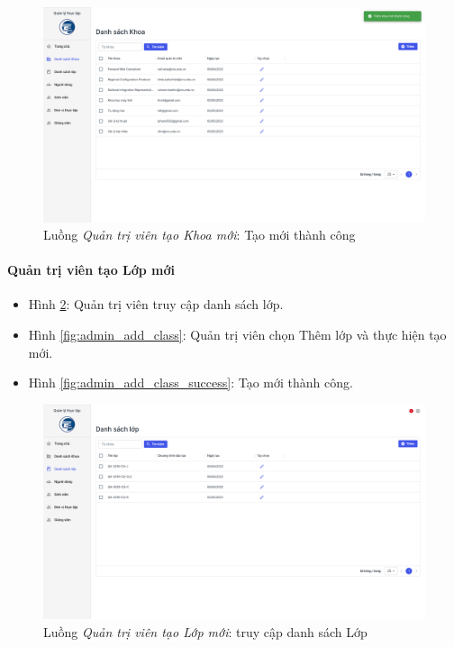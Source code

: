 \documentclass[./../main.tex]{subfiles}
\begin{document}
\begin{figure}[]
	\includegraphics[width=\linewidth]{./images/image58.png}
	\caption{Luồng \emph{Quản trị viên tạo Khoa mới}: Tạo mới thành công}
	\label{fig:admin_add_org_success}
\end{figure}

\paragraph*{Quản trị viên tạo Lớp mới}

\begin{itemize}
	\item Hình \ref{fig:admin_access_list_classes}: Quản trị viên truy cập danh sách lớp. 
	\item Hình \ref{fig:admin_add_class}: Quản trị viên chọn Thêm lớp và thực hiện tạo mới.
	\item Hình \ref{fig:admin_add_class_success}: Tạo mới thành công.
\end{itemize}

\begin{figure}[]
	\includegraphics[width=\linewidth]{./images/image59.png}
	\caption{Luồng \emph{Quản trị viên tạo Lớp mới}: truy cập danh sách Lớp}
	\label{fig:admin_access_list_classes}
\end{figure}
\end{document}
